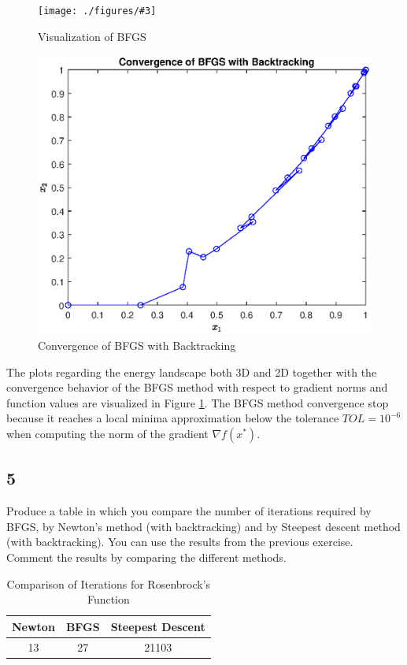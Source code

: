 \documentclass[unicode,11pt,a4paper,oneside,numbers=endperiod,openany]{scrartcl}
\newcommand{\myFigureEnergy}[3]{
    \begin{figure}[h]
    \centering
    \caption{#1}
    \label{#2}
    \texttt{[image: ./figures/\#3]}
    \end{figure}
}
\begin{document}
\myFigureEnergy
    {Visualization of BFGS}
    {fig:ex2-bfgs-energy}
    {ex2-bfgs-energy.eps}

\begin{figure}[H]
    \centering
    \caption{Convergence of BFGS with Backtracking}
    \label{fig:ex2-bfgs-convergence}
    \includegraphics[width=.6\textwidth, trim={0cm 0cm 0cm 0cm}, clip]{./figures/ex2-bfgs-convergence.eps}
\end{figure}

The plots regarding the energy landscape both 3D and 2D together with 
the convergence behavior of the BFGS method with respect to gradient norms and function values 
are visualized in Figure \ref{fig:ex2-bfgs-energy}.
The BFGS method convergence stop because it reaches a local minima approximation 
below the tolerance $TOL = 10^{-6}$ when computing the norm of the gradient $\nabla f(x^*)$.

\subsection*{5}
Produce a table in which you compare the number of iterations required by BFGS, 
by Newton's method (with backtracking) and by Steepest descent method (with backtracking). 
You can use the results from the previous exercise. 
Comment the results by comparing the different methods.

\begin{table}[h] 
    \centering
    \caption{Comparison of Iterations for Rosenbrock's Function}
    \label{tab:ex2-iterations-comparison}
    \begin{tabular}{@{}ccc@{}}
        \toprule
        Newton & BFGS & Steepest Descent \\
        \midrule
        13  & 27 & 21103 \\
        \bottomrule
    \end{tabular}
\end{table}
\end{document}
